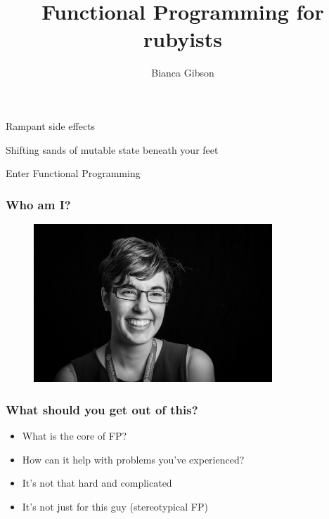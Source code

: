 \documentclass{beamer}
\title{Functional Programming for rubyists}
\author{Bianca Gibson}
\institute{Ruby Conf AU 2016}
\date{}
\begin{document}
\frame{\titlepage}

\begin{frame}
\begin{center}
\Huge Rampant side effects
\end{center}
\end{frame}

\begin{frame}
\begin{center}
\Huge Shifting sands of mutable state beneath your feet
\end{center}
\end{frame}

\begin{frame}
\begin{center}
\Huge Enter Functional Programming
\end{center}
\end{frame}

\begin{frame}
\frametitle{Who am I?}
\begin{figure}[p]
  \includegraphics[width=0.8\textwidth]{./assets/portrait.jpg}
\end{figure}
\end{frame}

\begin{frame}
\frametitle{What should you get out of this?}
\begin{itemize}
  \item What is the core of FP?
  \item How can it help with problems you've experienced?
  \item It's not that hard and complicated
  \item It's not just for this guy (stereotypical FP)
\end{itemize}
\end{frame}
\end{document}
